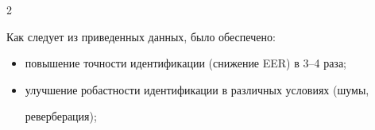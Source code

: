 \begin{multicols}{2}
  


  Как следует из приведенных данных, было обеспечено:\\[-14pt]


  \begin{itemize}


\item повышение точности идентификации (снижение EER) в 3--4 раза;\\[-14pt]


\item улучшение робастности идентификации в различных условиях (шумы, 


реверберация);


\end{itemize}





\end{multicols}





